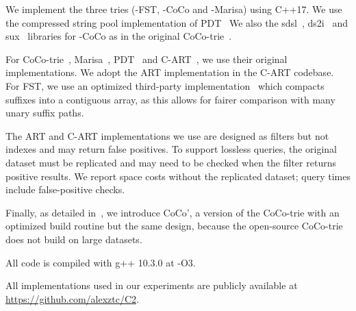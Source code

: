  We implement the three \csquared tries (\csquared-FST,
\csquared-CoCo and \csquared-Marisa) using C++17. We use the compressed string
pool implementation of PDT~\cite{pdt-code}  We also  the sdsl~\cite{sds_overview,
  sdsl_lib}, ds2i~\cite{ds2i} and sux~\cite{rank_select_0} libraries for
\csquared-CoCo as in the original CoCo-trie~\cite{coco-code}.

For CoCo-trie~\cite{coco-code}, Marisa~\cite{marisa-code}, PDT~\cite{pdt-code}
and C-ART~\cite{cart-code}, we use their original implementations. We adopt the
ART implementation in the C-ART codebase. For FST, we use an optimized
third-party implementation~\cite{fst-code} which compacts suffixes into a
contiguous array, as this allows for fairer comparison with many unary suffix
paths. 


The ART and C-ART implementations we use are designed as filters but not indexes
and may return false positives. To support lossless queries, the original
dataset must be replicated and may need to be checked when the filter returns
positive results. We report space costs without the replicated dataset; query
times include false-positive checks.

Finally, as detailed in~, we introduce CoCo', a version of
the CoCo-trie with an optimized build routine but the same \bv design, because
the open-source CoCo-trie does not build on large datasets.

All code is compiled with g++ 10.3.0 at -O3.

All implementations used in our experiments are publicly available at
\url{https://github.com/alexztc/C2}.

